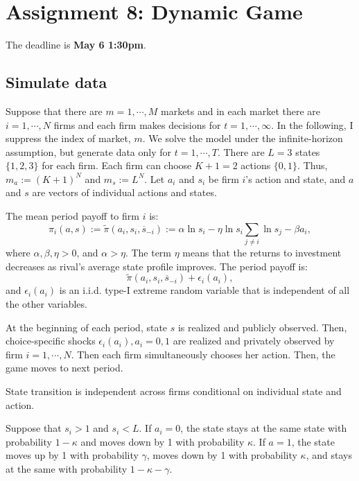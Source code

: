 \documentclass[
]{book}
\begin{document}
\hypertarget{assignment8}{%
\chapter{Assignment 8: Dynamic Game}\label{assignment8}}

The deadline is \textbf{May 6 1:30pm}.

\hypertarget{simulate-data}{%
\section{Simulate data}\label{simulate-data}}

Suppose that there are \(m = 1, \cdots, M\) markets and in each market there are \(i = 1, \cdots, N\) firms and each firm makes decisions for \(t = 1, \cdots, \infty\). In the following, I suppress the index of market, \(m\). We solve the model under the infinite-horizon assumption, but generate data only for \(t = 1, \cdots, T\). There are \(L = 3\) states \(\{1, 2, 3\}\) for each firm. Each firm can choose \(K + 1 = 2\) actions \(\{0, 1\}\). Thus, \(m_a := (K + 1)^N\) and \(m_s := L^N\). Let \(a_i\) and \(s_i\) be firm \(i\)'s action and state, and \(a\) and \(s\) are vectors of individual actions and states.

The mean period payoff to firm \(i\) is:
\[
\pi_i(a, s) := \tilde{\pi}(a_i, s_i, \overline{s}_{-i}) :=  \alpha \ln s_i - \eta \ln s_i \sum_{j \neq i} \ln s_j - \beta a_i,
\]
where \(\alpha, \beta, \eta> 0\), and \(\alpha > \eta\). The term \(\eta\) means that the returns to investment decreases as rival's average state profile improves. The period payoff is:
\[
\tilde{\pi}(a_i, s_i, \overline{s}_{-i})+ \epsilon_i(a_i),
\]
and \(\epsilon_i(a_i)\) is an i.i.d. type-I extreme random variable that is independent of all the other variables.

At the beginning of each period, state \(s\) is realized and publicly observed. Then, choice-specific shocks \(\epsilon_i(a_i), a_i = 0, 1\) are realized and privately observed by firm \(i = 1, \cdots, N\). Then each firm simultaneously chooses her action. Then, the game moves to next period.

State transition is independent across firms conditional on individual state and action.

Suppose that \(s_i > 1\) and \(s_i < L\). If \(a_i = 0\), the state stays at the same state with probability \(1 - \kappa\) and moves down by 1 with probability \(\kappa\). If \(a = 1\), the state moves up by 1 with probability \(\gamma\), moves down by 1 with probability \(\kappa\), and stays at the same with probability \(1 - \kappa - \gamma\).
\end{document}
